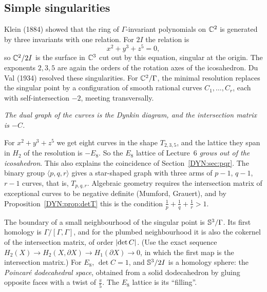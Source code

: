 \subsection*{Simple singularities}
Klein (1884) showed that the ring of $\Gamma$-invariant polynomials on $\mathbb{C}^2$ is generated by three
invariants with one relation. For $2I$ the relation is
\[
  x^2+y^3+z^5=0,
\]
so $\mathbb{C}^2/2I$ is the surface in $\mathbb{C}^3$ cut out by this equation, singular at the origin. The exponents
$2,3,5$ are again the orders of the rotation axes of the icosahedron. Du Val (1934) resolved these
singularities. For $\mathbb{C}^2/\Gamma$, the minimal resolution replaces the singular point by a configuration
of smooth rational curves $C_1,\dots,C_r$, each with self-intersection $-2$, meeting transversally.
\begin{center}
\emph{The dual graph of the curves is the Dynkin diagram, and the intersection matrix is $-C$.}
\end{center}
For $x^2+y^3+z^5$ we get eight curves in the shape $T_{2,3,5}$, and the lattice they span in
$H_2$ of the resolution is $-E_8$. So the $E_8$ lattice of Lecture~6 \emph{grows out of the icosahedron}.
This also explains the coincidence of Section~\ref{DYN:sec:pqr}. The binary group $\langle p,q,r\rangle$
gives a star-shaped graph with three arms of $p-1$, $q-1$, $r-1$ curves, that is, $T_{p,q,r}$. Algebraic geometry
requires the intersection matrix of exceptional curves to be negative definite (Mumford, Grauert), and
by Proposition~\ref{DYN:prop:detT} this is the condition $\frac1p+\frac1q+\frac1r>1$.

The boundary of a small neighbourhood of the singular point is $\mathbb{S}^3/\Gamma$. Its first homology is
$\Gamma/[\Gamma,\Gamma]$, and for the plumbed neighbourhood it is also the cokernel of the intersection
matrix, of order $\left\lvert \det C \right\rvert$. (Use the exact sequence $H_2(X)\to H_2(X,\partial X)\to H_1(\partial X)\to0$,
in which the first map is the intersection matrix.) For $E_8$, $\det C=1$, and $\mathbb{S}^3/2I$ is a homology
sphere: the \emph{Poincar\'e dodecahedral space}, obtained from a solid dodecahedron by gluing opposite
faces with a twist of $\frac\pi5$. The $E_8$ lattice is its ``filling''.

